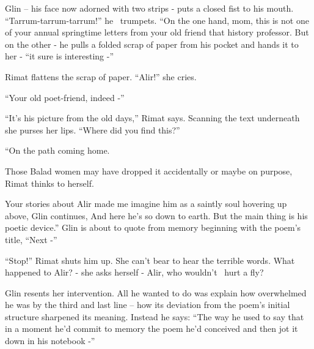 \documentclass[letterpaper]{article}
\begin{document}
\textcolor[rgb]{0.13333334,0.13333334,0.13333334}{Glin }{}-- his face now adorned with two strips
-\textcolor[rgb]{0.0,0.4392157,0.7529412}{ }\textcolor[rgb]{0.13333334,0.13333334,0.13333334}{puts }a closed fist
\textcolor[rgb]{0.13333334,0.13333334,0.13333334}{to his mouth. }{}``Tarrum-tarrum-tarrum!'' he \ trumpets. ``On the
one hand, mom,\textcolor[rgb]{0.13333334,0.13333334,0.13333334}{ this is not one of your annual springtime letters from
your old friend that}\textcolor{red}{ }\textcolor[rgb]{0.13333334,0.13333334,0.13333334}{history professor. But on the
other{\textquotedbl} - he pulls a folded scrap of paper from his pocket and hands it to }her
-\textcolor[rgb]{0.13333334,0.13333334,0.13333334}{ ``it sure is interesting -'' }

\textcolor[rgb]{0.13333334,0.13333334,0.13333334}{Rimat flattens the scrap of paper. ``Alir!'' she cries.}

\textcolor[rgb]{0.13333334,0.13333334,0.13333334}{{}``Your old poet-friend, indeed -''}

\textcolor[rgb]{0.13333334,0.13333334,0.13333334}{{}``It's his picture from the old days,'' Rimat says. Scanning the
text underneath she purses her lips. ``Where did you find this?'' }

\textcolor[rgb]{0.13333334,0.13333334,0.13333334}{{}``On the path coming home.{\textquotedbl} }

Those Balad women may have dropped it accidentally or maybe on purpose, Rimat thinks to
herself\textcolor[rgb]{0.13333334,0.13333334,0.13333334}{. }

\textcolor[rgb]{0.13333334,0.13333334,0.13333334}{{\textquotedbl}Your stories about Alir made me imagine him as a
saintly soul hovering up above,{\textquotedbl} Glin continues, {\textquotedbl}And here he's so down to earth. But the
main thing is his poetic device.'' Glin is about to quote from memory beginning with the poem's title, ``Next -'' }

\textcolor[rgb]{0.13333334,0.13333334,0.13333334}{{}``Stop!'' Rimat }shuts him
up\textcolor[rgb]{0.13333334,0.13333334,0.13333334}{. She can't bear to hear the terrible words. What happened to Alir?
- she asks herself - Alir, who wouldn't~ hurt a fly?}

\textcolor[rgb]{0.13333334,0.13333334,0.13333334}{Glin }resents her intervention. All he wanted to do
was\textcolor[rgb]{0.13333334,0.13333334,0.13333334}{ explain how overwhelmed he was by the third and last line -- how
its deviation from the poem's initial structure sharpened its meaning. Instead he says: ``The way he used to say that
in a moment he'd commit to memory the poem }he'd conceived \textcolor[rgb]{0.13333334,0.13333334,0.13333334}{and then
jot it down in his notebook -'' }
\end{document}
